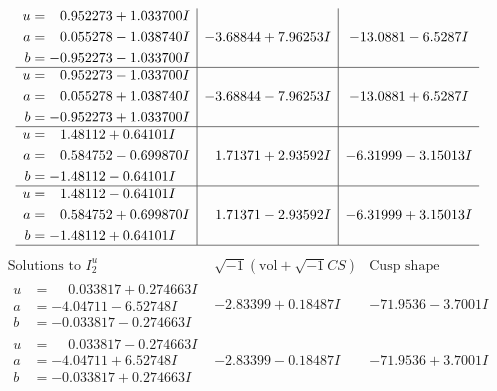 \documentclass[1p]{elsarticle_modified}
\theoremstyle{definition}
\newcommand{\I}{\sqrt{-1}}
\begin{document}
$$\begin{array}{c|c|c}
\begin{aligned}
u &= \phantom{-}0.952273 + 1.033700 I \\
a &= \phantom{-}0.055278 - 1.038740 I \\
b &= -0.952273 - 1.033700 I\end{aligned}
 & -3.68844 + 7.96253 I & -13.0881 - 6.5287 I \\ \hline\begin{aligned}
u &= \phantom{-}0.952273 - 1.033700 I \\
a &= \phantom{-}0.055278 + 1.038740 I \\
b &= -0.952273 + 1.033700 I\end{aligned}
 & -3.68844 - 7.96253 I & -13.0881 + 6.5287 I \\ \hline\begin{aligned}
u &= \phantom{-}1.48112 + 0.64101 I \\
a &= \phantom{-}0.584752 - 0.699870 I \\
b &= -1.48112 - 0.64101 I\end{aligned}
 & \phantom{-}1.71371 + 2.93592 I & -6.31999 - 3.15013 I \\ \hline\begin{aligned}
u &= \phantom{-}1.48112 - 0.64101 I \\
a &= \phantom{-}0.584752 + 0.699870 I \\
b &= -1.48112 + 0.64101 I\end{aligned}
 & \phantom{-}1.71371 - 2.93592 I & -6.31999 + 3.15013 I\\
 \hline 
 \end{array}$$\newpage$$\begin{array}{c|c|c}  
\text{Solutions to }I^u_{2}& \I (\text{vol} + \sqrt{-1}CS) & \text{Cusp shape}\\
 \hline 
\begin{aligned}
u &= \phantom{-}0.033817 + 0.274663 I \\
a &= -4.04711 - 6.52748 I \\
b &= -0.033817 - 0.274663 I\end{aligned}
 & -2.83399 + 0.18487 I & -71.9536 - 3.7001 I \\ \hline\begin{aligned}
u &= \phantom{-}0.033817 - 0.274663 I \\
a &= -4.04711 + 6.52748 I \\
b &= -0.033817 + 0.274663 I\end{aligned}
 & -2.83399 - 0.18487 I & -71.9536 + 3.7001 I \\ \hline\begin{aligned}

\end{aligned}
\end{array}$$
\end{document}
